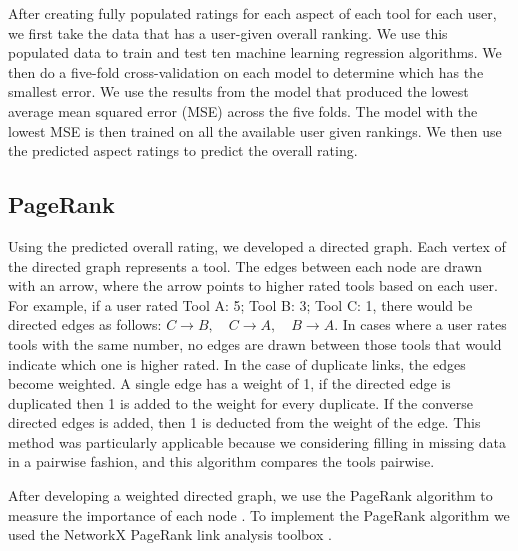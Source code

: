 After creating fully populated ratings for each aspect of each tool for each user, we first take the data that has a user-given overall ranking. We use this populated data to train and test ten machine learning regression algorithms. We then do a five-fold cross-validation on each model to determine which has the smallest error. We use the results from the model that produced the lowest average mean squared error (MSE) across the five folds. The model with the lowest MSE is then trained on all the available user given rankings. We then use the predicted aspect ratings to predict the overall rating.
\vspace{-2mm}
\subsection{PageRank}
\vspace{-2mm}
Using the predicted overall rating, we developed a directed graph. Each vertex of the directed graph represents a tool. The edges between each node are drawn with an arrow, where the arrow points to higher rated tools based on each user. For example, if a user rated Tool A: 5; Tool B: 3; Tool C: 1, there would be directed edges as follows:
$C \rightarrow B, \quad
C \rightarrow A, \quad
B \rightarrow A. $
In cases where a user rates tools with the same number, no edges are drawn between those tools that would indicate which one is higher rated. In the case of duplicate links, the edges become weighted. A single edge has a weight of 1, if the directed edge is duplicated then 1 is added to the weight for every duplicate. If the converse directed edges is added, then 1 is deducted from the weight of the edge. This method was particularly applicable because we considering filling in missing data in a pairwise fashion, and this algorithm compares the tools pairwise.

After developing a weighted directed graph, we use the PageRank algorithm to measure the importance of each node \cite{page1999pagerank}. To implement the PageRank algorithm we used the NetworkX PageRank link analysis toolbox \cite{hagberg2008exploring}. 
\vspace{-2mm}
